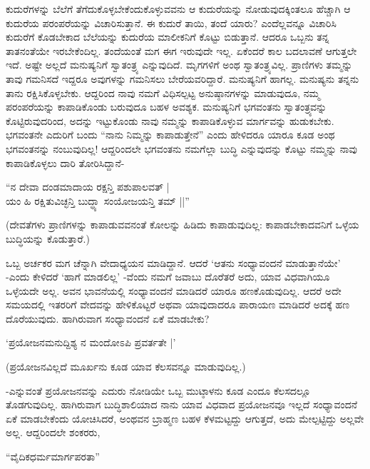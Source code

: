 ಕುದುರೆಗಳನ್ನು ಬೆಲೆಗೆ ತೆಗೆದುಕೊಳ್ಳಬೇಕೆಂದುಕೊಳ್ಳುವವನು ಆ ಕುದುರೆಯನ್ನು ನೋಡುವುದಕ್ಕಿಂತಲೂ ಹೆಚ್ಚಾಗಿ ಆ ಕುದುರೆಯ ಪರಂಪರೆಯನ್ನು ವಿಚಾರಿಸುತ್ತಾನೆ. ಈ ಕುದುರೆ ತಾಯಿ, ತಂದೆ ಯಾರು? ಎಂದೆಲ್ಲವನ್ನೂ ವಿಚಾರಿಸಿ ಕುದುರೆಗೆ ಕೊಡಬೇಕಾದ ಬೆಲೆಯನ್ನು ಕುದುರೆಯ ಮಾಲೀಕನಿಗೆ ಕೊಟ್ಟು ಬಿಡುತ್ತಾನೆ. ಆದರೂ ಒಬ್ಬನು ತನ್ನ ತಾತನಂತೆಯೇ ಇರಬೇಕೆಂದಿಲ್ಲ. ತಂದೆಯಂತೆ ಮಗ ಈಗ ಇರುವುದೇ ಇಲ್ಲ. ಏಕೆಂದರೆ ಕಾಲ ಬದಲಾವಣೆ ಆಗುತ್ತಲೇ ಇದೆ. ಅಷ್ಟೇ ಅಲ್ಲದೆ ಮನುಷ್ಯನಿಗೆ ಸ್ವಾತಂತ್ರ್ಯ ಎನ್ನುವುದಿದೆ. ಮೃಗಗಳಿಗೆ ಅಂಥ ಸ್ವಾತಂತ್ರ್ಯವಿಲ್ಲ. ಪ್ರಾಣಿಗಳು ತಮ್ಮನ್ನು ತಾವು ಗಮನಿಸದೆ ಇದ್ದರೂ ಅವುಗಳನ್ನು ಗಮನಿಸಲು ಬೇರೆಯವರಿದ್ದಾರೆ. ಮನುಷ್ಯನಿಗೆ ಹಾಗಲ್ಲ. ಮನುಷ್ಯನು ತನ್ನನು ತಾನು ರಕ್ಷಿಸಿಕೊಳ್ಳಬೇಕು. ಆದ್ದರಿಂದ ನಾವು ನಮಗೆ ವಿಧಿಸಲ್ಪಟ್ಟ ಅನುಷ್ಠಾನಗಳನ್ನು ಮಾಡುವುದೂ, ನಮ್ಮ ಪರಂಪರೆಯನ್ನು ಕಾಪಾಡಿಕೊಂಡು ಬರುವುದೂ ಬಹಳ ಅವಶ್ಯಕ. ಮನುಷ್ಯನಿಗೆ ಭಗವಂತನು ಸ್ವಾತಂತ್ರ್ಯವನ್ನು ಕೊಟ್ಟಿರುವುದರಿಂದ, ಅದನ್ನು ಇಟ್ಟುಕೊಂಡು ನಾವು ನಮ್ಮನ್ನು ಕಾಪಾಡಿಕೊಳ್ಳುವ ಮಾರ್ಗವನ್ನು ಹುಡುಕಬೇಕು. ಭಗವಂತನೇ ಎದುರಿಗೆ ಬಂದು ``ನಾನು ನಿಮ್ಮನ್ನು ಕಾಪಾಡುತ್ತೇನೆ'' ಎಂದು ಹೇಳಿದರೂ ಯಾರೂ ಕೂಡ ಅಂಥ ಭಗವಂತನನ್ನು ನಂಬುವುದಿಲ್ಲ! ಆದ್ದರಿಂದಲೇ ಭಗವಂತನು ನಮಗೆಲ್ಲಾ ಬುದ್ಧಿ ಎನ್ನುವುದನ್ನು ಕೊಟ್ಟು ನಮ್ಮನ್ನು ನಾವು ಕಾಪಾಡಿಕೊಳ್ಳಲು ದಾರಿ ತೋರಿಸಿದ್ದಾನೆ-

\begin{shloka}
``ನ ದೇವಾ ದಂಡಮಾದಾಯ ರಕ್ಷನ್ತಿ ಪಶುಪಾಲವತ್ |\\
ಯಂ ಹಿ ರಕ್ಷಿತುವಿಚ್ಛನ್ತಿ ಬುದ್ಧ್ಯಾ ಸಂಯೋಜಯನ್ತಿ ತಮ್ ||''
\end{shloka}

(ದೇವತೆಗಳು ಪ್ರಾಣಿಗಳನ್ನು ಕಾಪಾಡುವವನಂತೆ ಕೋಲನ್ನು ಹಿಡಿದು ಕಾಪಾಡುವುದಿಲ್ಲ: ಕಾಪಾಡಬೇಕಾದವನಿಗೆ ಒಳ್ಳೆಯ ಬುದ್ಧಿಯನ್ನು ಕೊಡುತ್ತಾರೆ.)


ಒಬ್ಬ ಅರ್ಚಕರ ಮಗ ಚೆನ್ನಾಗಿ ವೇದಾಧ್ಯಯನ ಮಾಡಿದ್ದಾನೆ. ಆದರೆ `ಆತನು ಸಂಧ್ಯಾವಂದನೆ ಮಾಡುತ್ತಾನೆಯೇ' -ಎಂದು ಕೇಳಿದರೆ `ಹಾಗೆ ಮಾಡಲಿಲ್ಲ' -ವೆಂದು ನಮಗೆ ಜವಾಬು ದೊರೆತರೆ ಅದು, ಯಾವ ವಿಧವಾಗಿಯೂ ಒಳ್ಳೆಯದೇ ಅಲ್ಲ. ಅವನ ಭಾವನೆಯಲ್ಲಿ ಸಂಧ್ಯಾವಂದನೆ ಮಾಡಿದರೆ ಯಾರೂ ಹಣಕೊಡುವುದಿಲ್ಲ. ಆದರೆ ಅದೇ ಸಮಯದಲ್ಲಿ ಇತರರಿಗೆ ವೇದವನ್ನು ಹೇಳಿಕೊಟ್ಟರೆ ಅಥವಾ ಯಾವುದಾದರೂ ಪಾರಾಯಣ ಮಾಡಿದರೆ ಅದಕ್ಕೆ ಹಣ ದೊರೆಯುವುದು. ಹಾಗಿರುವಾಗ ಸಂಧ್ಯಾವಂದನೆ ಏಕೆ ಮಾಡಬೇಕು?

\begin{shloka}
`ಪ್ರಯೋಜನಮನುದ್ದಿಶ್ಯ ನ ಮಂದೋಽಪಿ ಪ್ರವರ್ತತೇ |'
\end{shloka}

(ಪ್ರಯೋಜನವಿಲ್ಲದೆ ಮೂರ್ಖನು ಕೂಡ ಯಾವ ಕೆಲಸವನ್ನೂ ಮಾಡುವುದಿಲ್ಲ.)

-ಎನ್ನುವಂತೆ ಪ್ರಯೋಜನವನ್ನು ಎದುರು ನೋಡಿಯೇ ಒಬ್ಬ ಮುಟ್ಠಾಳನು ಕೂಡ ಎಂದೂ ಕೆಲಸದಲ್ಲೂ ತೊಡಗುವುದಿಲ್ಲ. ಹಾಗಿರುವಾಗ ಬುದ್ಧಿಶಾಲಿಯಾದ ನಾನು ಯಾವ ವಿಧವಾದ ಪ್ರಯೋಜನವೂ ಇಲ್ಲದೆ ಸಂಧ್ಯಾವಂದನೆ ಏಕೆ ಮಾಡಬೇಕೆಂದು ಯೋಚಿಸಿದರೆ, ಅಂಥವನ ಬ್ರಾಹ್ಮಣ ಬಹಳ ಕೆಳಮಟ್ಟದ್ದು ಆಗುತ್ತದೆ, ಅದು ಮೇಲ್ಪಟ್ಟಿದ್ದು ಅಲ್ಲವೇ ಅಲ್ಲ. ಆದ್ದರಿಂದಲೇ ಶಂಕರರು,

\begin{shloka}
``ವೈದಿಕಧರ್ಮಮಾರ್ಗಪರತಾ''
\end{shloka}

